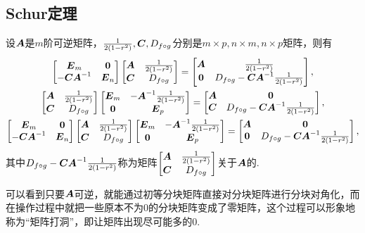 \subsection{Schur定理}
\begin{theorem}[Schur定理]\label{theorem:逆矩阵.Schur定理}
设\(\A\)是\(m\)阶可逆矩阵，\(\B,\C,\D\)分别是\(m \times p, n \times m, n \times p\)矩阵，则有\begin{gather}
\begin{bmatrix}
\E_m & \z \\
-\C\A^{-1} & \E_n
\end{bmatrix} \begin{bmatrix}
\A & \B \\
\C & \D
\end{bmatrix} = \begin{bmatrix}
\A & \B \\
\z & \D - \C \A^{-1} \B
\end{bmatrix},
\\
\begin{bmatrix}
\A & \B \\
\C & \D
\end{bmatrix} \begin{bmatrix}
\E_m & -\A^{-1} \B \\
\z & \E_p
\end{bmatrix} = \begin{bmatrix}
\A & \z \\
\C & \D - \C \A^{-1} \B
\end{bmatrix},
\\
\begin{bmatrix}
\E_m & \z \\
-\C \A^{-1} & \E_n
\end{bmatrix} \begin{bmatrix}
\A & \B \\
\C & \D
\end{bmatrix} \begin{bmatrix}
\E_m & -\A^{-1} \B \\
\z & \E_p
\end{bmatrix} = \begin{bmatrix}
\A & \z \\
\z & \D - \C \A^{-1} \B
\end{bmatrix},
\end{gather}
其中\(\D - \C \A^{-1} \B\)称为矩阵\(\begin{bmatrix} \A & \B \\ \C & \D \end{bmatrix}\)关于\(\A\)的.
\end{theorem}
可以看到只要\(\A\)可逆，就能通过初等分块矩阵直接对分块矩阵进行分块对角化，而在操作过程中就把一些原本不为0的分块矩阵变成了零矩阵，这个过程可以形象地称为“矩阵打洞”，即让矩阵出现尽可能多的0.

